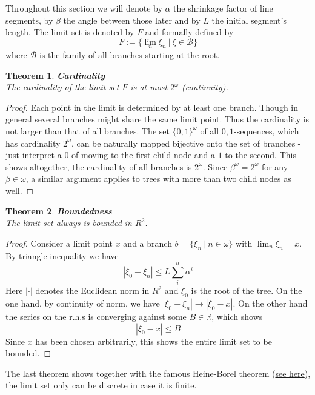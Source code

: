 \documentclass[17pt]{extarticle}
\newtheorem{theorem}{Theorem}
\begin{document}
Throughout this section we will denote by $\alpha$ the shrinkage factor of line segments, by $\beta$ the angle between those later and by $L$ the initial segment's length. The limit set is denoted by $F$ and formally defined by
$$
F:=\{\lim_{n}\xi_n \ | \ \xi\in \mathcal{B}\}
$$
where $\mathcal{B}$ is the family of all branches starting at the root.
	
\begin{theorem} \label{cardinality}
	\textbf{Cardinality}\\
	The cardinality of the limit set $F$ is at most $2^{\omega}$ (continuity).
\end{theorem}
\begin{proof}
Each point in the limit is determined by at least one branch. Though in general several branches might share the same limit point. Thus the cardinality is not larger than that of all branches. The set $\{0,1\}^{\omega}$ of all ${0,1}$-sequences, which has cardinality $2^{\omega}$, can be naturally mapped bijective onto the set of branches - just interpret a $0$ of moving to the first child node and a $1$ to the second.
This shows altogether, the cardinality of all branches is $2^{\omega}$.
Since $\beta^{\omega}=2^{\omega}$ for any $\beta\in\omega$, a similar argument applies to trees with more than two child nodes as well.
\end{proof}

\begin{theorem}
	\textbf{Boundedness}\\
	The limit set always is bounded in $R^2$.
\end{theorem}
\begin{proof}
Consider a limit point $x$ and a branch $b=\{\xi_n \ | \ n\in\omega\}$ with $\lim_n \xi_n = x$. By triangle inequality we have
$$
|\xi_0 - \xi_n|\leq L\sum_i^n \alpha^i
$$
Here $|\cdot|$ denotes the Euclidean norm in $R^2$ and $\xi_0$ is the root of the tree.
On the one hand, by continuity of norm, we have $|\xi_0-\xi_n| \rightarrow |\xi_0-x|$. On the other hand the series on the r.h.s is converging against some $B\in\mathbb{R}$,
which shows
$$
|\xi_0 - x|\leq B
$$
Since $x$ has been chosen arbitrarily, this shows the entire limit set to be bounded.
\end{proof}

The last theorem shows together with the famous Heine-Borel theorem (\href{https://en.wikipedia.org/wiki/Heine\%E2\%80\%93Borel_theorem}{see here}), the limit set only can be discrete in case it is finite.
\end{document}
